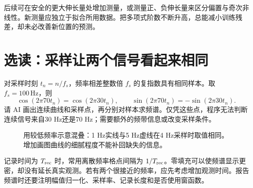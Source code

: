 \documentclass[11pt,openany,fontset=fandol]{ctexbook}
\theoremstyle{plain}\newtheorem{theorem}{定理}[chapter]\newtheorem{proposition}[theorem]{命题}
\theoremstyle{definition}\newtheorem{definition}{定义}[chapter]\newtheorem{example}{例}[chapter]
\theoremstyle{remark}\newtheorem*{remark}{说明}
\begin{document}
后续可在安全的更大伸长量处增加测量，或测量正、负伸长量来区分偏置与奇次非线性。新测量应独立于拟合所用数据。把多项式阶数不断升高，总能减小训练残差，却未必改善新位置的预测。

\section{选读：采样让两个信号看起来相同}
对采样时刻 $t_n=n/f_s$，频率相差整数倍 $f_s$ 的复指数具有相同样本。取 $f_s=100\,\mathrm{Hz}$，则
\[
\cos(2\pi70t_n)=\cos(2\pi30t_n),\qquad
\sin(2\pi70t_n)=-\sin(2\pi30t_n).
\]
请 AI 画出连续曲线和采样点，再分别对样本求频谱。仅凭这些点，程序无法判断连续信号来自30 Hz还是70 Hz；需要额外的频带信息或改变采样条件。

\begin{figure}[htbp]\centering
{}
\caption{用较低频率示意混叠：1 Hz实线与5 Hz虚线在4 Hz采样时取值相同。增加画图曲线的细腻程度不能补回缺失的信息。}
\label{fig:orig-091}
\end{figure}

记录时间为 $T_{\rm rec}$ 时，常用离散频率格点间隔为 $1/T_{\rm rec}$。零填充可以使频谱显示更密，却没有延长真实观测。若有两个很接近的频率，应先考虑增加观测时间。报告频谱时还要注明幅值归一化、采样率、记录长度和是否使用窗函数。




\clearpage
\end{document}
